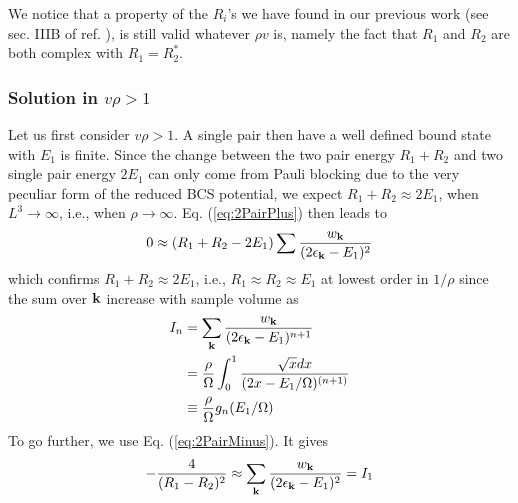 \documentclass[aps,prb,showpacs,reprint]{revtex4-1}
\begin{document}
We notice that a property of the $R_i$'s we have found in our previous work (see sec. IIIB of ref. \cite{combescotBCS}), is still valid whatever $\rho{}v$ is, namely the fact that $R_1$ and $R_2$ are both complex with $R_1=R_2^*$.%


\subsubsection{Solution in $v\rho>1$}
Let us first consider  $v\rho>1$.  A single pair then have a well defined bound state with $E_1$ is finite. Since the change between the two pair energy $R_{1}+R_{2}$ and two single pair energy $2E_{1}$ can only come from Pauli blocking due to the very peculiar form of the reduced BCS potential, we expect $R_1+R_2\approx2E_1$, when $L^3\rightarrow\infty$, i.e., when $\rho\rightarrow\infty$. Eq. (\ref{eq:2PairPlus}) then leads to  
\begin{equation*}
0\approx(R_1+R_2-2E_1)\sum\frac{w_{\mathbf{k}}}{(2\epsilon_{\mathbf{k}}-E_1)^2}
\label{eq:}
\end{equation*}
which confirms  $R_1+R_2\approx2E_1$, i.e.,  $R_1\approx{}R_2\approx{}E_1$ at lowest order in $1/\rho$ since the sum over $\mathbf{k}$ increase with sample volume as   
\begin{equation}
\begin{split}
I_n&=\sum_{\mathbf{k}}\frac{w_{\mathbf{k}}}{(2\epsilon_{\mathbf{k}}-E_1)^{n+1}}\\
	&=\frac{\rho}{\Omega}\int^1_0\frac{\sqrt{x}dx}{(2x-E_1/\Omega)^{(n+1)}}\\
	&\equiv\frac{\rho}{\Omega}g_n(E_1/\Omega)
\end{split}
\label{eq:}
\end{equation}
To go further, we use Eq. (\ref{eq:2PairMinus}). It gives 
\begin{equation}
-\frac{4}{(R_1-R_2)^2}\approx\sum_{\mathbf{k}}\frac{w_{\mathbf{k}}}{(2\epsilon_{\mathbf{k}}-E_1)^2}=I_1
\label{eq:}
\end{equation}
\end{document}
